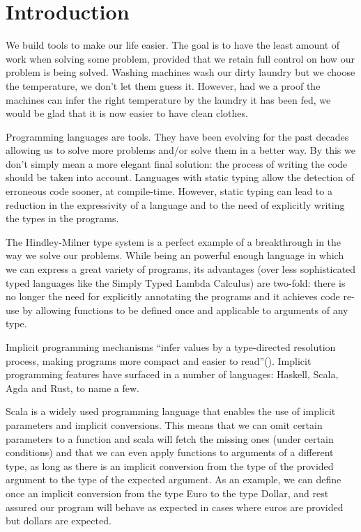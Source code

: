\chapter{Introduction}
\label{cha:intro}
We build tools to make our life easier. The goal is to have the least amount of work when solving some problem, provided that we retain full control on how our problem is being solved. Washing machines wash our dirty laundry but we choose the temperature, we don't let them guess it. However, had we a proof the machines can infer the right temperature by the laundry it has been fed, we would be glad that it is now easier to have clean clothes.

Programming languages are tools. They have been evolving for the past decades allowing us to solve more problems and/or solve them in a better way. By this we don't simply mean a more elegant final solution: the process of writing the code should be taken into account. Languages with static typing allow the detection of erroneous code sooner, at compile-time. However, static typing can lead to a reduction in the expressivity of a language and to the need of explicitly writing the types in the programs.

The Hindley-Milner type system is a perfect example of a breakthrough in the way we solve our problems. While being an powerful enough language in which we can express a great variety of programs, its advantages (over less sophisticated typed languages like the Simply Typed Lambda Calculus) are two-fold: there is no longer the need for explicitly annotating the programs and it achieves code re-use by allowing functions to be defined once and applicable to arguments of any type.

Implicit programming mechanisms ``infer values by a type-directed resolution process, making programs more compact and easier to read''(\cite{cochis}). Implicit programming features have surfaced in a number of languages: Haskell, Scala, Agda and Rust, to name a few. 

Scala is a widely used programming language that enables the use of implicit parameters and implicit conversions. This means that we can omit certain parameters to a function and scala will fetch the missing ones (under certain conditions) and that we can even apply functions to arguments of a different type, as long as there is an implicit conversion from the type of the provided argument to the type of the expected argument. As an example, we can define once an implicit conversion from the type Euro to the type Dollar, and rest assured our program will behave as expected in cases where euros are provided but dollars are expected.

